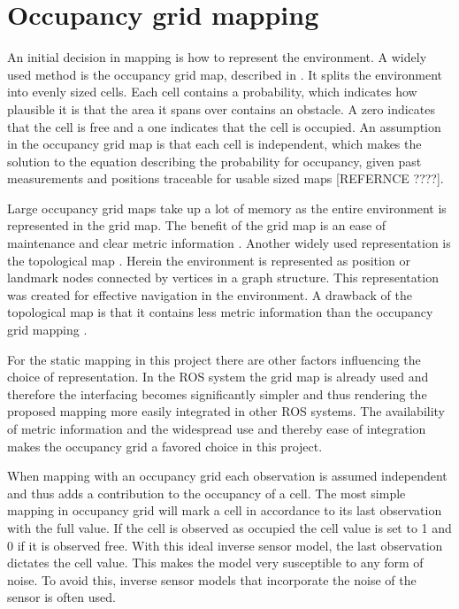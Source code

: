 \section{Occupancy grid mapping}
\label{sec:occupancy_grid_mapping}

An initial decision in mapping is how to represent the environment. A widely used method is the occupancy grid map, described in \cite{elfesMoravecOccGrid}. It splits the environment into evenly sized cells. 
Each cell contains a probability, which indicates how plausible it is that the area it spans over contains an obstacle.
A zero indicates that the cell is free and a one indicates that the cell is occupied.
An assumption in the occupancy grid map is that each cell is independent, which makes the solution to the equation describing the probability for occupancy, given past measurements and positions traceable for usable sized maps [REFERNCE ????]. 

Large occupancy grid maps take up a lot of memory as the entire environment is represented in the grid map. 
The benefit of the grid map is an ease of maintenance and clear metric information \cite{mapbuildingSummary}. 
Another widely used representation is the topological map \cite{topologyOrig}. 
Herein the environment is represented as position or landmark nodes connected by vertices in a graph structure. 
This representation was created for effective navigation in the environment. 
A drawback of the topological map is that it contains less metric information than the occupancy grid mapping \cite{mapbuildingSummary}.

For the static mapping in this project there are other factors influencing the choice of representation. In the ROS system the grid map is already used and therefore the interfacing becomes significantly simpler and thus rendering the proposed mapping more easily integrated in other ROS systems. The availability of metric information and the widespread use and thereby ease of integration makes the occupancy grid a favored choice in this project. 

When mapping with an occupancy grid each observation is assumed independent and thus adds a contribution to the occupancy of a cell. The most simple mapping in occupancy grid will mark a cell in accordance to its last observation with the full value. If the cell is observed as occupied the cell value is set to 1 and 0 if it is observed free.
With this ideal inverse sensor model, the last observation dictates the cell value. 
This makes the model very susceptible to any form of noise. 
To avoid this, inverse sensor models that incorporate the noise of the sensor is often used.

